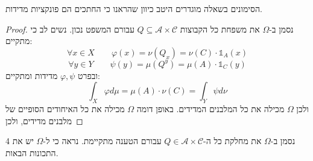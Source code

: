 \documentclass{tstextbook}
\begin{document}
\begin{remark}
הסימונים בשאלה מוגדרים היטב כיוון שהראנו כי החתכים הם פונקציות מדידות.

\end{remark}
\begin{proof}
נסמן ב-\(\Omega\) את משפחת כל הקבוצות \(Q\subseteq \mathcal{A}\times \mathcal{C}\) עבורם המשפט נכון. נשים לב כי מתקיים:
$$\forall x\in X\qquad\varphi\left(x\right)=\nu\left(Q_{x}\right)=\nu\left(C\right)\cdot\mathbb{1}_{A}\left(x\right)$$$$\forall y\in Y\qquad\psi\left(y\right)=\mu\left(Q^{y}\right)=\mu\left(A\right)\cdot\mathbb{1}_{C}\left(y\right)$$
ובפרט \(\varphi,\psi\) מדידות ומתקיים:
$$\int_{X}\varphi d\mu=\mu\left(A\right)\cdot\nu\left(C\right)=\int_{Y}\psi d\nu$$
ולכן \(\Omega\) מכילה את כל המלבנים המדידים. באופן דומה \(\Omega\) מכילה את כל האיחודים הסופיים של מלבנים מדידים, ולכן 

\end{proof}
נסמן ב-\(\Omega\) את מחלקת כל ה-\({Q} \in \mathcal{A}\times \mathcal{C}\) עבורם הטענה מתקיימת. נראה כי ל-\(\Omega\) יש את 4 התכונות הבאות. 
\end{document}
